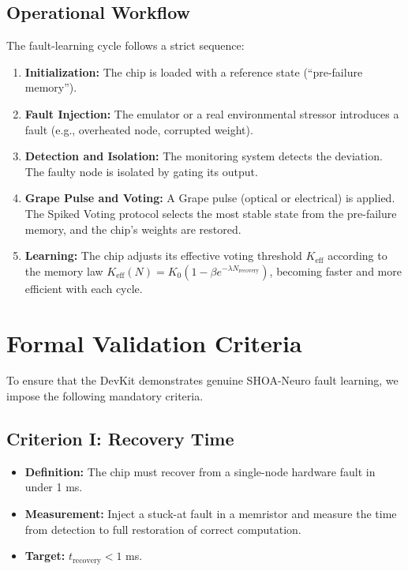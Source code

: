 \documentclass[12pt]{article}
\begin{document}
\subsection{Operational Workflow}
The fault-learning cycle follows a strict sequence:
\begin{enumerate}
    \item \textbf{Initialization:} The chip is loaded with a reference state (``pre-failure memory'').
    \item \textbf{Fault Injection:} The emulator or a real environmental stressor introduces a fault (e.g., overheated node, corrupted weight).
    \item \textbf{Detection and Isolation:} The monitoring system detects the deviation. The faulty node is isolated by gating its output.
    \item \textbf{Grape Pulse and Voting:} A Grape pulse (optical or electrical) is applied. The Spiked Voting protocol selects the most stable state from the pre-failure memory, and the chip's weights are restored.
    \item \textbf{Learning:} The chip adjusts its effective voting threshold $K_{\text{eff}}$ according to the memory law $K_{\text{eff}}(N) = K_0(1 - \beta e^{-\lambda N_{\text{recovery}}})$, becoming faster and more efficient with each cycle.
\end{enumerate}

\section{Formal Validation Criteria}
To ensure that the DevKit demonstrates genuine SHOA-Neuro fault learning, we impose the following mandatory criteria.

\subsection{Criterion I: Recovery Time}
\begin{itemize}
    \item \textbf{Definition:} The chip must recover from a single-node hardware fault in under 1 ms.
    \item \textbf{Measurement:} Inject a stuck-at fault in a memristor and measure the time from detection to full restoration of correct computation.
    \item \textbf{Target:} $t_{\text{recovery}} < 1$ ms.
\end{itemize}
\end{document}
